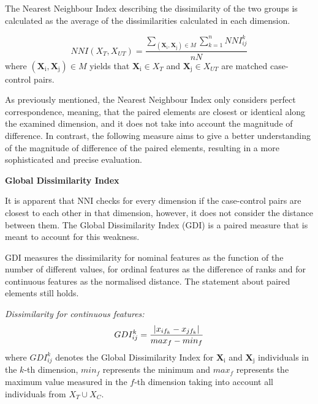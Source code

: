 The Nearest Neighbour Index describing the dissimilarity of the two groups is calculated as the average of the dissimilarities calculated in each dimension.

\begin{equation}
	NNI(X_T,X_{UT})=\frac{\sum_{(\bm{\mathrm{\textbf{X}_i}}, \bm{\mathrm{\textbf{X}_j}})\in M}\sum_{k=1}^nNNI_{ij}^k}{nN}\label{eq:nni}
\end{equation}
where $(\bm{\mathrm{\textbf{X}_i}}, \bm{\mathrm{\textbf{X}_j}})\in M$ yields that $\bm{\mathrm{\textbf{X}_i}} \in X_T$ and $\bm{\mathrm{\textbf{X}_j}} \in X_{UT}$ are matched case-control pairs. %

As previously mentioned, the Nearest Neighbour Index only considers perfect correspondence, meaning, that the paired elements are closest or identical along the examined dimension, and it does not take into account the magnitude of difference. In contrast, the following measure aims to give a better understanding of the magnitude of difference of the paired elements, resulting in a more sophisticated and precise evaluation.  

\vspace{0.5cm}
\noindent \textbf{Global Dissimilarity Index}

\noindent It is apparent that NNI checks for every dimension if the case-control pairs are closest to each other in that dimension, however, it does not consider the distance between them. The Global Dissimilarity Index (GDI) is a paired measure that is meant to account for this weakness.

GDI measures the dissimilarity for nominal features as the function of the number of different values, for ordinal features as the difference of ranks and for continuous features as the normalised distance. The statement about paired elements still holds.

\vspace{0.3cm}
\noindent\emph{Dissimilarity for continuous features:}
\begin{equation}
	GDI_{ij}^k=\frac{\lvert x_{if_k}-x_{jf_k}\rvert}{max_f-min_f}
	\label{eq:ddi_cont}
\end{equation}
where $GDI_{ij}^{k}$ denotes the Global Dissimilarity Index for $\bm{\mathrm{\textbf{X}_i}}$ and $\bm{\mathrm{\textbf{X}_j}}$ individuals in the $k$-th dimension, $min_f$ represents the minimum and $max_f$ represents the maximum value measured in the $f$-th dimension taking into account all individuals from ${X_T \cup X_C}$.

